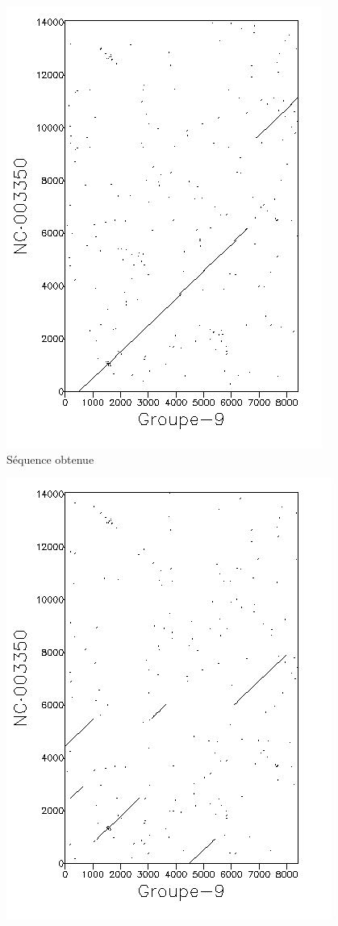 \begin{figure}[!ht]
	\begin{minipage}[r]{.46\linewidth}
		\begin{center}
		\includegraphics[scale= 0.7]{../res/cible4.png}
Séquence obtenue	\end{center}
\end{minipage} \hfill
\begin{minipage}[c]{.46 \linewidth}
	\begin{center}
			\includegraphics[scale= 0.7]{../res/cible4-ic.png}

\end{center}
\end{minipage}
\end{figure}

